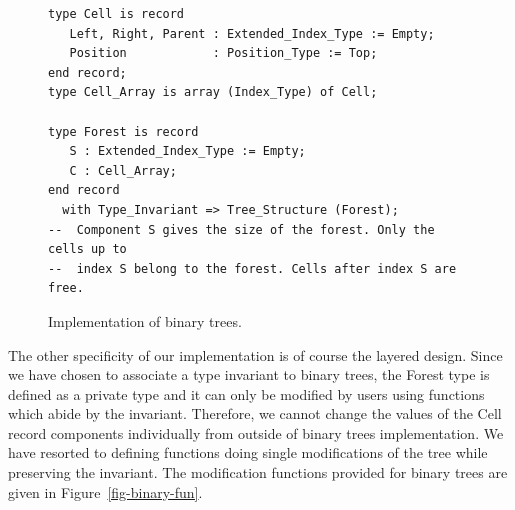 \documentclass[11pt,a4paper]{article}
\begin{document}
\begin{figure}[ht]
\begin{small}
\begin{lstlisting}
type Cell is record
   Left, Right, Parent : Extended_Index_Type := Empty;
   Position            : Position_Type := Top;
end record;
type Cell_Array is array (Index_Type) of Cell;

type Forest is record
   S : Extended_Index_Type := Empty;
   C : Cell_Array;
end record
  with Type_Invariant => Tree_Structure (Forest);
--  Component S gives the size of the forest. Only the cells up to
--  index S belong to the forest. Cells after index S are free.
\end{lstlisting}
\end{small}
\caption{\label{fig-binary-typ} Implementation of binary trees.}
\end{figure}

The other specificity of our implementation is of course the layered design. Since we
have chosen to associate a type invariant to binary trees, the Forest type is defined as
a private type and it can only be modified by users using functions which abide by the
invariant. Therefore, we cannot change the values of the Cell record components individually
from outside of binary trees implementation. We have resorted to defining functions
doing single modifications of the tree while preserving the invariant. The modification
functions provided for binary trees are given in Figure~\ref{fig-binary-fun}.
\end{document}
